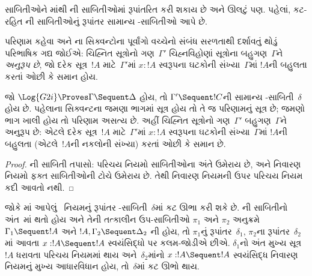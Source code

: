 \label{guunit:OLP-0678}


સાબિતીઓને
માંથી
ની
સાબિતીઓમાં
રૂપાંતરિત કરી
શકાય છે અને
ઊલટું પણ.
પહેલાં, કટ-રહિત
ની
સાબિતીઓનું
રૂપાંતર સામાન્ય
-સાબિતીઓ
આપે છે.

પરિણામ કહેવા
 અને
ના
સિક્વન્ટોના
પૂર્વાંગો વચ્ચેનો
સંબંધ સરળતાથી
દર્શાવતું થોડું
પરિભાષિક ગદ્ય
જોઈએ: ચિહ્નિત
સૂત્રોનો
ગણ~$\Gamma'$
ચિહ્નવિહોણાં
સૂત્રોના
બહુગણ~$\Gamma$ને
\emph{અનુરૂપ છે},
જો દરેક
સૂત્ર~$!A$
માટે~$\Gamma'$માં
$x : !A$
સ્વરૂપના
ઘટકોની
સંખ્યા~$\Gamma$માં
$!A$ની બહુલતા
કરતાં ઓછી કે
સમાન હોય.

\begin{cor}
જો
$\Log{G2i} \Proves \Gamma \Sequent \Delta$
હોય, તો
$\Gamma' \Sequent !C$ની
સામાન્ય
-સાબિતી~$\delta$
હોય છે. પહેલાના
સિક્વન્ટના જમણા
ભાગમાં સૂત્ર
હોય તો તે
જ પરિણામનું
સૂત્ર છે; જમણો
ભાગ ખાલી હોય
તો પરિણામ
અસત્ય છે.
અહીં
ચિહ્નિત
સૂત્રોનો
ગણ~$\Gamma'$
બહુગણ~$\Gamma$ને
અનુરૂપ છે:
એટલે દરેક
સૂત્ર~$!A$
માટે~$\Gamma'$માં
$x : !A$
સ્વરૂપના
ઘટકોની
સંખ્યા~$\Gamma$માં
$!A$ની બહુલતા
(એટલે~$!A$ની
નકલોની સંખ્યા)
કરતાં ઓછી કે
સમાન છે.
\end{cor}

\begin{proof}
ની
સાબિતી તપાસો:
પરિચય નિયમો
સાબિતીઓના
અંતે ઉમેરાય છે,
અને નિવારણ
નિયમો ફક્ત
સાબિતીઓની
ટોચે ઉમેરાય
છે. તેથી
નિવારણ
નિયમની ઉપર
પરિચય
નિયમ કદી
આવતો નથી.
\end{proof}

જોકે
માં
આપેલું~\Cut{}
નિયમનું રૂપાંતર
-સાબિતી~$\delta$માં
કટ ઊભા કરી
શકે છે.
ની
સાબિતીનો
અંત~\Cut{}માં
થતો હોય અને
તેની તત્કાલીન
ઉપ-સાબિતીઓ
$\pi_1$ અને
$\pi_2$ અનુક્રમે
$\Gamma_1
\Sequent !A$
અને
$!A, \Gamma_2 \Sequent \Delta_2$
ની હોય, તો
$\pi_1$નું
રૂપાંતર~$\delta_1$,
$\pi_2$ના
રૂપાંતર~$\delta_2$માં
આવતા
$x:!A
\Sequent !A$
સ્વયંસિદ્ધો પર
કલમ-જોડીએ છીએ.
$\delta_1$નો
અંત મુખ્ય
સૂત્ર~$!A$
ધરાવતા
પરિચય
નિયમમાં થાય
અને~$\delta_2$માંનો
$x:!A \Sequent !A$
સ્વયંસિદ્ધ
નિવારણ
નિયમનું મુખ્ય
આધારવિધાન હોય,
તો~$\delta$માં
કટ ઊભો થાય.

